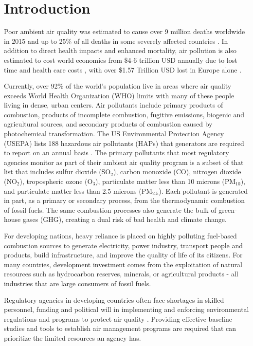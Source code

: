\chapter{Introduction}

Poor ambient air quality was estimated to cause over 9 million deaths worldwide in 2015 and up to 25\% of all deaths in some severely affected countries \citep{Landrigan2017}. In addition to direct health impacts and enhanced mortality, air pollution is also estimated to cost world economies from \$4-6 trillion USD annually due to lost time and health care costs \citep{Landrigan2017, Narain2016}, with over \$1.57 Trillion USD lost in Europe alone \citep{Roy2015}.

Currently, over 92\% of the world's population live in areas where air quality exceeds World Health Organization (WHO) limits \citep{WHO2016} with many of these people living in dense, urban centers. Air pollutants include primary products of combustion, products of incomplete combustion, fugitive emissions, biogenic and agricultural sources, and secondary products of combustion caused by photochemical transformation. The US Environmental Protection Agency (USEPA) lists 188 hazardous air pollutants (HAPs) that generators are required to report on an annual basis \citep{USEPA1996}. The primary pollutants that most regulatory agencies monitor as part of their ambient air quality program is a subset of that list that includes sulfur dioxide (SO$_{2}$), carbon monoxide (CO), nitrogen dioxide (NO$_{2}$), tropospheric ozone (O$_{3}$),  particulate matter less than 10 microns (PM$_{10}$), and particulate matter less than 2.5 microns (PM$_{2.5}$). Each pollutant is generated in part, as a primary or secondary process, from the thermodynamic combustion of fossil fuels. The same combustion processes also generate the bulk of green-house gases (GHG), creating a dual risk of bad health and climate change.

For developing nations, heavy reliance is placed on highly polluting fuel-based combustion sources to generate electricity, power industry, transport people and products, build infrastructure, and improve the quality of life of its citizens. For many countries, development investment comes from the exploitation of natural resources such as hydrocarbon reserves, minerals, or agricultural products - all industries that are large consumers of fossil fuels.

Regulatory agencies in developing countries often face shortages in skilled personnel, funding and political will in implementing and enforcing environmental regulations and programs to protect air quality \citep{Freeman2015a}. Providing effective baseline studies and tools to establish air management programs are required that can prioritize the limited resources an agency has. 

